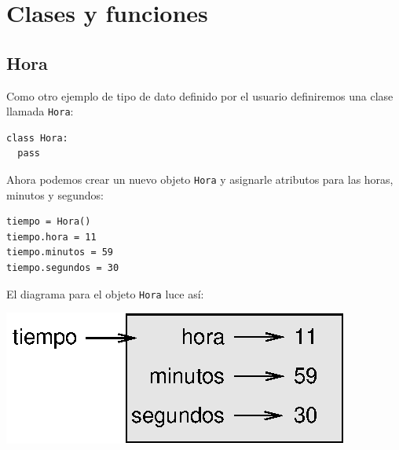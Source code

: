 


\chapter{Clases y funciones}
\label{time}


\section{Hora}

Como otro ejemplo de tipo de dato definido por el usuario definiremos
una clase llamada \texttt{Hora}:

\beforeverb
\begin{verbatim}
class Hora:
  pass
\end{verbatim}
\afterverb
%
Ahora podemos crear un nuevo objeto \texttt{Hora} y asignarle atributos
para las horas, minutos y segundos:

\beforeverb
\begin{verbatim}
tiempo = Hora()
tiempo.hora = 11
tiempo.minutos = 59
tiempo.segundos = 30
\end{verbatim}
\afterverb
%
El diagrama para el objeto \texttt{Hora} luce así:

\beforefig
\centerline{\includegraphics{illustrations/time.eps}}
\afterfig

